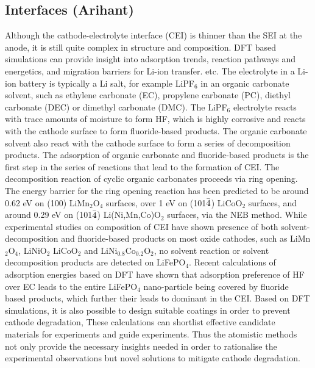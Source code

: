 \documentclass[../main.tex]{subfiles}
\begin{document}
\subsection{Interfaces (Arihant)}
Although the cathode-electrolyte interface (CEI) is thinner than the SEI at the anode, it is still quite complex in structure and composition.\cite{Gauthier2015, Edstrom2004} DFT based simulations can provide insight into adsorption trends,\cite{Bhandari2020} reaction pathways and energetics,\cite{Tebbe2015a, Tebbe2015b} and migration barriers for Li-ion transfer.\cite{Bhandari2019} etc. The electrolyte in a Li-ion battery is typically a Li salt, for example LiPF$_6$ in an organic carbonate solvent, such as ethylene carbonate (EC), propylene carbonate (PC), diethyl carbonate (DEC) or dimethyl carbonate (DMC). The LiPF$_6$ electrolyte reacts with trace amounts of moisture to form HF,\cite{Tebbe2015a} which is highly corrosive and reacts with the cathode surface to form fluoride-based products.\cite{Tebbe2015b} The organic carbonate solvent  also react with the cathode surface to form a series of decomposition products.\cite{Tebbe2016} The adsorption of organic carbonate and fluoride-based products is the first step in the series of reactions that lead to the formation of CEI. The decomposition reaction of cyclic organic carbonates proceeds via ring opening. The energy barrier for the ring opening reaction has been predicted to be around 0.62 eV on (100) LiMn$_2$O$_4$ surfaces,\cite{leung2012first} over 1 eV on (101$\Bar{4}$) LiCoO$_2$ surfaces,\cite{Tebbe2016} and around 0.29 eV on (101$\Bar{4}$) Li(Ni,Mn,Co)O$_2$ surfaces,\cite{Xu2017} via the NEB method.\cite{JONSSON1998} While experimental studies on composition of CEI have shown presence of both solvent-decomposition and fluoride-based products on most oxide cathodes, such as LiMn$_2$O$_4$, LiNiO$_2$ LiCoO$_2$ and LiNi$_{0.8}$Co$_{0.2}$O$_2$, no solvent reaction or solvent decomposition products are detected on LiFePO$_4$.\cite{Edstrom2004, Malmgren2010} Recent calculations of adsorption energies based on DFT have shown that adsorption preference of HF over EC leads to the entire LiFePO$_4$ nano-particle being covered by fluoride based products, which further their leads to dominant in the CEI.\cite{Bhandari2020} Based on DFT simulations, it is also possible to design suitable coatings in order to prevent cathode degradation,\cite{Tebbe2015b} These calculations can shortlist effective candidate materials for experiments and guide experiments. Thus the atomistic methods not only provide the necessary insights needed in order to rationalise the experimental observations but novel solutions to mitigate cathode degradation.
\end{document}
